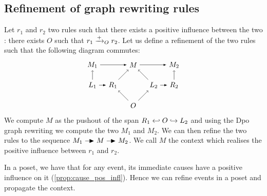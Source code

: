 
\subsection{Refinement of graph rewriting rules}

Let $r_1$ and $r_2$ two rules such that there exists a positive influence between the two : there exists $O$ such that $r_1 \mathrel{\xrightarrow{+}}_O r_2$. Let us define a refinement of the two rules
such that the following diagram commutes:
\[
\begin{tikzpicture} %
  \node (o) at (0,-1) {\(O\)};
  \node (p) at (0,1) {\(M\)};
  \node (r1) at (-1,0) {\(R_1\)};
  \node (l1) at (-2,0) {\(L_1\)};
  \node (l2) at (1,0) {\(L_2\)};
  \node (r2) at (2,0) {\(R_2\)};
  \node (m1) at (-2,1) {\(M_1\)};
  \node (m2) at (2,1) {\(M_2\)};
  \draw [->] (l1) -- (m1);
  \draw [->] (r2) -- (m2);
  \draw [->] (o) -- (r1);
  \draw [->] (o) -- (l2);
  \draw [->] (r1) -- (p);
  \draw [->] (l2) -- (p);
  \draw [>=latex, ->] (m1) -- (p);
  \draw [>=latex, ->] (p) -- (m2);
  \draw [>=latex, ->] (l1) -- (r1);
  \draw [>=latex, ->] (l2) -- (r2);
\end{tikzpicture}
\]
We compute $M$ as the pushout of the span $R_1\hookleftarrow O\hookrightarrow L_2$ and using the Dpo graph rewriting we compute the two $M_1$ and $M_2$. We can then refine the two rules to the sequence $M_1\action M\action M_2$. We call $M$ the context which realises the positive influence between $r_1$ and $r_2$.

In a poset, we have that for any event, its immediate causes have a positive influence on it (\autoref{prop:cause_pos_infl}). Hence we can refine events in a poset and propagate the context.


